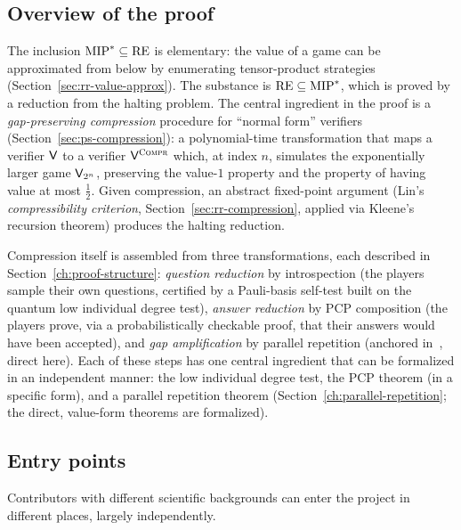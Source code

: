 
\subsection{Overview of the proof}
\label{sec:overview}

The inclusion $\mathrm{MIP}^* \subseteq \mathrm{RE}$ is elementary: the value of a game can be
approximated from below by enumerating tensor-product strategies
(Section~\ref{sec:rr-value-approx}). The substance is $\mathrm{RE} \subseteq \mathrm{MIP}^*$, which is proved by
a reduction from the halting problem.
The central ingredient in the proof is a \emph{gap-preserving compression}
procedure for ``normal form'' verifiers (Section~\ref{sec:ps-compression}): a polynomial-time
transformation that maps a verifier $\mathsf{V}$ to a verifier $\mathsf{V}^{\textsc{Compr}}$ which, at index
$n$, simulates the exponentially larger game $\mathsf{V}_{2^n}$, preserving the value-$1$
property and the property of having value at most $\frac12$. Given compression, an
abstract fixed-point argument (Lin's \emph{compressibility criterion},
Section~\ref{sec:rr-compression}, applied via Kleene's recursion theorem) produces the
halting reduction.

Compression itself is assembled from three transformations, each described in
Section~\ref{ch:proof-structure}:
\emph{question reduction} by introspection (the players sample their own questions,
certified by a Pauli-basis self-test built on the quantum low individual degree test),
\emph{answer reduction} by PCP composition (the players prove, via a probabilistically
checkable proof, that their answers would have been accepted), and \emph{gap
amplification} by parallel repetition (anchored in~\cite{JNVWY20}, direct here). Each of these steps has one central
ingredient that can be formalized in an independent manner: the low individual degree
test, the PCP theorem (in a specific form), and a parallel repetition theorem
(Section~\ref{ch:parallel-repetition}; the direct, value-form theorems are formalized).

\subsection{Entry points}
\label{sec:entry-points}

Contributors with different scientific backgrounds can enter the project in different places, largely independently.

